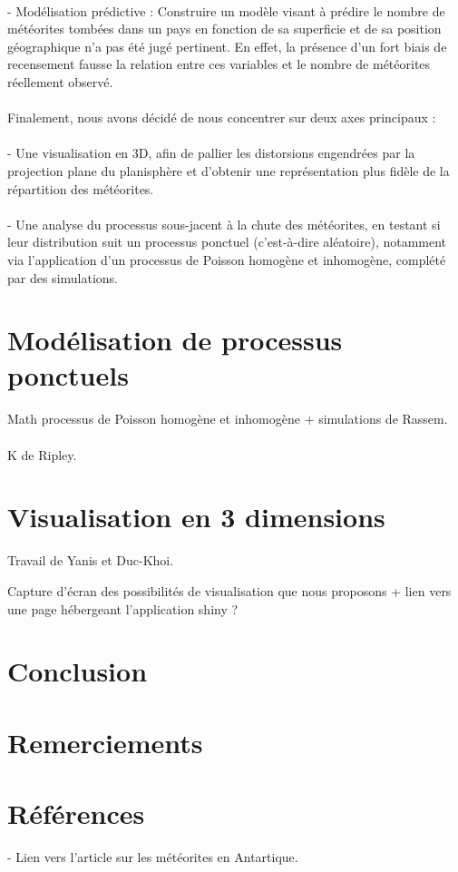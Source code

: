 \documentclass[12pt]{article}
\begin{document}
\\
- Modélisation prédictive : Construire un modèle visant à prédire le nombre de météorites tombées dans un pays en fonction de sa superficie et de sa position géographique n’a pas été jugé pertinent. En effet, la présence d’un fort biais de recensement fausse la relation entre ces variables et le nombre de météorites réellement observé.\\
\\
Finalement, nous avons décidé de nous concentrer sur deux axes principaux :\\
\\
- Une visualisation en 3D, afin de pallier les distorsions engendrées par la projection plane du planisphère et d’obtenir une représentation plus fidèle de la répartition des météorites.\\
\\
- Une analyse du processus sous-jacent à la chute des météorites, en testant si leur distribution suit un processus ponctuel (c’est-à-dire aléatoire), notamment via l’application d’un processus de Poisson homogène et inhomogène, complété par des simulations.

\section{Modélisation de processus ponctuels}
Math processus de Poisson homogène et inhomogène + simulations de Rassem.\\
\\
K de Ripley.\\
\section{Visualisation en 3 dimensions}
Travail de Yanis et Duc-Khoi.

Capture d'écran des possibilités de visualisation que nous proposons + lien vers une page hébergeant l'application shiny ?

\section{Conclusion}
\section{Remerciements}
\cite{these_remi_coulaud}
\section{Références}
\printbibliography
- Lien vers l'article sur les météorites en Antartique.
\end{document}
